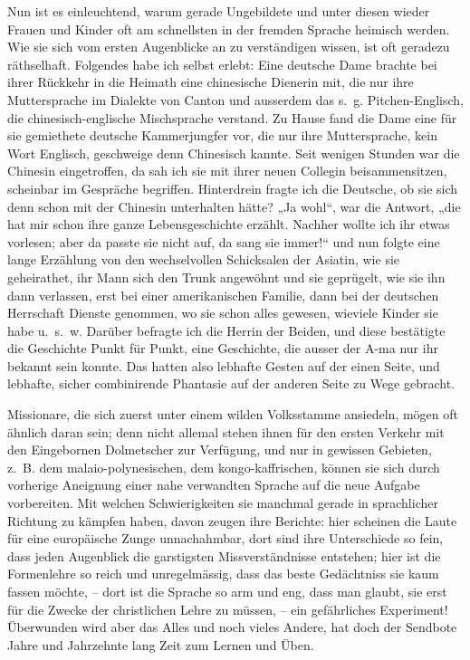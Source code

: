 Nun ist es einleuchtend, warum gerade Ungebildete und unter diesen wieder Frauen und Kinder oft am schnellsten in der fremden Sprache heimisch werden. Wie sie sich vom ersten Augenblicke an zu verständigen wissen, ist oft geradezu räthselhaft. Folgendes habe ich selbst erlebt: Eine deutsche Dame brachte bei ihrer Rückkehr in die Heimath eine chinesische Dienerin mit, die nur ihre Muttersprache im Dialekte von Canton und ausserdem das s.~g. Pitchen-Englisch, die chinesisch-englische Mischsprache verstand. Zu Hause fand die Dame eine für sie gemiethete deutsche Kammerjungfer vor, die nur ihre Muttersprache, kein Wort Englisch, geschweige denn Chinesisch kannte. Seit wenigen Stunden war die Chinesin eingetroffen, da sah ich sie mit ihrer neuen Collegin beisammensitzen, scheinbar im Gespräche begriffen. Hinterdrein fragte ich die Deutsche, ob sie sich denn schon mit der Chinesin unterhalten hätte? „Ja wohl“, war die Antwort, „die hat mir schon ihre ganze Lebensgeschichte erzählt. \label{sp.68} Nachher wollte ich ihr etwas vorlesen; aber da passte sie nicht auf, da sang sie immer!“ und nun folgte eine lange Erzählung von den wechselvollen Schicksalen der Asiatin, wie sie geheirathet, ihr Mann sich den Trunk angewöhnt und sie geprügelt, wie sie ihn dann verlassen, erst bei einer amerikanischen Familie, dann bei der deutschen Herrschaft Dienste genommen, wo sie schon alles gewesen, wieviele Kinder sie habe u.~s.~w. Darüber befragte ich die Herrin der Beiden, und diese bestätigte die Geschichte Punkt für Punkt, eine Ge\label{fp.69}schichte, die ausser der A-ma nur ihr bekannt sein konnte. Das hatten also lebhafte Gesten auf der einen Seite, und lebhafte, sicher combinirende Phantasie auf der anderen Seite zu Wege gebracht.

Missionare, die sich zuerst unter einem wilden Volksstamme ansiedeln, mögen oft ähnlich daran sein; denn nicht allemal stehen ihnen für den ersten Verkehr mit den Eingebornen Dolmetscher zur Verfügung, und nur in gewissen Gebieten, z.~B. dem malaio-polynesischen, dem kongo-kaffrischen, können sie sich durch vorherige Aneignung einer nahe verwandten Sprache auf die neue Aufgabe vorbereiten. Mit welchen Schwierigkeiten sie manchmal gerade in sprachlicher Richtung zu kämpfen haben, davon zeugen ihre Berichte: hier scheinen die Laute für eine europäische Zunge unnachahmbar, dort sind ihre Unterschiede so fein, dass jeden Augenblick die garstigsten Missverständnisse entstehen; hier ist die Formenlehre so reich und unregelmässig, dass das beste Gedächtniss sie kaum fassen möchte, – dort ist die Sprache so arm und eng, dass man glaubt, sie erst für die Zwecke der christlichen Lehre  zu müssen, – ein gefährliches Experiment! Überwunden wird aber das Alles und noch vieles Andere, hat doch der Sendbote Jahre und Jahrzehnte lang Zeit zum Lernen und Üben.

